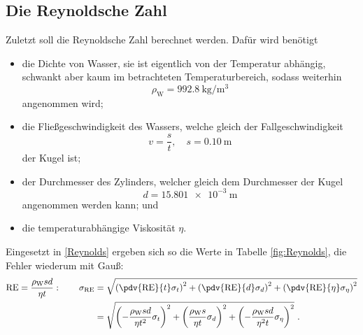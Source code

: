 \subsection{Die Reynoldsche Zahl}
Zuletzt soll die Reynoldsche Zahl berechnet werden. Dafür wird benötigt
\begin{itemize}
	\item die Dichte von Wasser, sie ist eigentlich von der Temperatur abhängig, schwankt aber kaum im betrachteten Temperaturbereich, sodass weiterhin \[ \rho_\text{W}=\SI{992.8}{\kilo\gram\per\metre\cubed} \] angenommen wird;
	\item die Fließgeschwindigkeit des Wassers, welche gleich der Fallgeschwindigkeit
	\[ v = \frac{s}{t}, \quad s=\SI{0.10}{\metre} \] der Kugel ist;
	\item der Durchmesser des Zylinders, welcher gleich dem Durchmesser der Kugel \[ d = \SI{15.801e-3}{\metre} \] angenommen werden kann; und
	\item die temperaturabhängige Viskosität $\eta$.
\end{itemize}
Eingesetzt in \eqref{Reynolds} ergeben sich so die Werte in Tabelle \ref{fig:Reynolds}, die Fehler wiederum mit Gauß:
\begin{align}
	\text{RE} = \frac{\rho_\text{W} s d}{\eta t}: \qquad \sigma_{\text{RE}} &= \sqrt{\left(\pdv{\text{RE}}{t}\sigma_t\right)^2+\left(\pdv{\text{RE}}{d}\sigma_d\right)^2+\left(\pdv{\text{RE}}{\eta}\sigma_\eta\right)^2} \\
	&= \sqrt{\left(-\frac{\rho_\text{W}sd}{\eta t^2}\sigma_t\right)^2+\left(\frac{\rho_\text{W}s}{\eta t}\sigma_d\right)^2+\left(-\frac{\rho_\text{W}sd}{\eta^2 t}\sigma_\eta\right)^2} \ .
\end{align}
